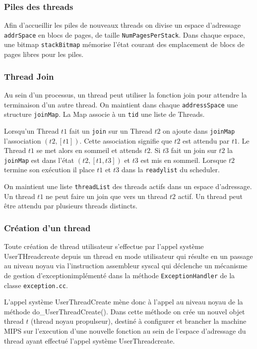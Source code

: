 \documentclass[11pt]{article}
\begin{document}
\subsubsection{Piles des threads}
Afin d'accueillir les piles de nouveaux threads on divise un espace d'adressage \texttt{addrSpace} en blocs de pages, de taille \texttt{NumPagesPerStack}.
Dans chaque espace, une bitmap \texttt{stackBitmap} mémorise l'état courant des emplacement de blocs de pages libres pour les piles. 

\subsubsection{Thread Join}
Au sein d'un processus, un thread peut utiliser la fonction join pour attendre la terminaison d'un autre thread.
On maintient dans chaque \texttt{addressSpace} une structure \texttt{joinMap}.
La Map associe à un \texttt{tid} une liste de Threads.

Lorsqu'un Thread $t1$ fait un \texttt{join} sur un Thread $t2$ on ajoute dans \texttt{joinMap}
l'association $(t2, [t1])$. Cette association signifie que $t2$ est attendu par $t1$.
Le Thread $t1$ se met alors en sommeil et attends $t2$. 
Si $t3$ fait un join sur $t2$ la \texttt{joinMap} est dans l'état $(t2, [t1,t3])$ et $t3$ est mis en sommeil.
Lorsque $t2$ termine son exécution il place $t1$ et $t3$ dans la \texttt{readylist} du scheduler.

On maintient une liste \texttt{threadList} des threads actifs dans un espace d'adressage.
Un thread $t1$ ne peut faire un join que vers un thread $t2$ actif.
Un thread peut être attendu par plusieurs threads distincts.

\subsubsection{Création d'un thread}
Toute création de thread utilisateur s'effectue par l'appel système UserTHreadcreate
depuis un thread en mode utilisateur qui résulte en un passage au niveau noyau
via l'instruction assembleur syscal qui déclenche un mécanisme de gestion d'exceptionimplémenté dans la méthode \texttt{ExceptionHandler} de la classe  \texttt{exception.cc}.

L'appel système UserThreadCreate mène donc à l'appel au niveau noyau de la méthode do_UserThreadCreate(). Dans cette méthode on crée un nouvel objet thread $t$ (thread noyau propulseur), destiné à configurer et brancher la machine MIPS sur l'execution d'une nouvelle fonction au sein de l'espace d'adressage du thread ayant effectué l'appel système UserThreadcreate.
\end{document}
